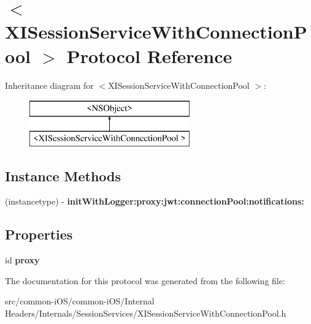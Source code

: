 \hypertarget{protocol_x_i_session_service_with_connection_pool_01-p}{}\section{$<$X\+I\+Session\+Service\+With\+Connection\+Pool $>$ Protocol Reference}
\label{protocol_x_i_session_service_with_connection_pool_01-p}
Inheritance diagram for $<$X\+I\+Session\+Service\+With\+Connection\+Pool $>$\+:\begin{figure}[H]
\begin{center}
\leavevmode
\includegraphics[height=2.000000cm]{protocol_x_i_session_service_with_connection_pool_01-p}
\end{center}
\end{figure}
\subsection*{Instance Methods}
\begin{DoxyCompactItemize}
\item 
\hypertarget{protocol_x_i_session_service_with_connection_pool_01-p_a2253c3758c97496f3da83c36676a450d}{}\label{protocol_x_i_session_service_with_connection_pool_01-p_a2253c3758c97496f3da83c36676a450d} 
(instancetype) -\/ {\bfseries init\+With\+Logger\+:proxy\+:jwt\+:connection\+Pool\+:notifications\+:}
\end{DoxyCompactItemize}
\subsection*{Properties}
\begin{DoxyCompactItemize}
\item 
\hypertarget{protocol_x_i_session_service_with_connection_pool_01-p_a55b894386559662f93615e10cde596db}{}\label{protocol_x_i_session_service_with_connection_pool_01-p_a55b894386559662f93615e10cde596db} 
id {\bfseries proxy}
\end{DoxyCompactItemize}


The documentation for this protocol was generated from the following file\+:\begin{DoxyCompactItemize}
\item 
src/common-\/i\+O\+S/common-\/i\+O\+S/\+Internal Headers/\+Internals/\+Session\+Services/X\+I\+Session\+Service\+With\+Connection\+Pool.\+h\end{DoxyCompactItemize}
